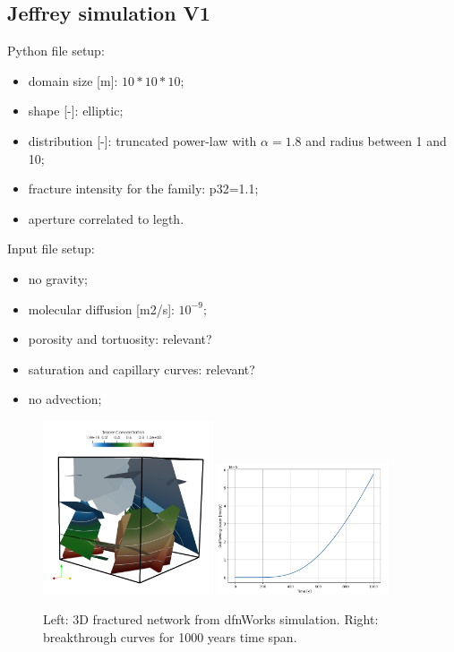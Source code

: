 \documentclass{article}
\begin{document}
\FloatBarrier
\subsection{Jeffrey simulation V1}
Python file setup:
\begin{itemize}
    \item domain size [m]: $10*10*10$;
    \item shape [-]: elliptic;
    \item distribution [-]: truncated power-law with $\alpha=1.8$ and radius between 1 and 10;
    \item fracture intensity for the family: p32=1.1;
    \item aperture correlated to legth.
\end{itemize}
Input file setup:
\begin{itemize}
    \item no gravity;
    \item molecular diffusion [m2/s]: $10^{-9}$;
    \item porosity and tortuosity: relevant?
    \item saturation and capillary curves: relevant?
    \item no advection;
\end{itemize}
\begin{figure}[htbp!]
    \centering
    \includegraphics[width=0.45\textwidth]{images/dfnWorksImages/3DdfnDiff.png}
    \hspace{0.05\textwidth}
    \includegraphics[width=0.45\textwidth]{images/dfnWorksImages/btcFrom3D.png}
    \caption{Left: 3D fractured network from dfnWorks simulation. Right: breakthrough curves for 1000 years time span.}
    \label{fig:3DdfnWorks}
\end{figure}
\FloatBarrier  %
\end{document}
